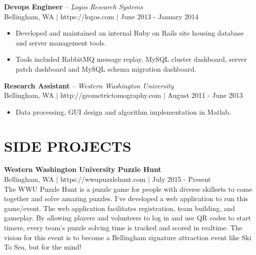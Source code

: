 \documentclass[line,margin]{res}
\begin{document}
\begin{resume}
    {\bf Devops Engineer} -- {\sl Logos Research Systems} \\
    {\footnotesize Bellingham, WA $|$ https://logos.com $|$ June 2013 - January 2014}
    \begin{itemize} \itemsep -2pt
        \item Developed and maintained an internal Ruby on Rails site housing database and server management tools.
        \item Tools included RabbitMQ message replay, MySQL cluster dashboard, server patch dashboard and MySQL schema migration dashboard.
    \end{itemize}

    {\bf Research Assistant} -- {\sl Western Washington University} \\
    {\footnotesize Bellingham, WA $|$ http://geometrictomography.com $|$ August 2011 - June 2013}
    \begin{itemize}  \itemsep -2pt
        \item Data processing, GUI design and algorithm implementation in Matlab.
    \end{itemize}



\newpage

\section{SIDE PROJECTS}
    {\bf Western Washington University Puzzle Hunt} \\
    {\footnotesize Bellingham, WA $|$ https://wwupuzzlehunt.com $|$ July 2015 - Present} \\
    The WWU Puzzle Hunt is a puzzle game for people with diverse skillsets to come together and solve amazing puzzles.
    I've developed a web application to run this game/event. The web application facilitates registration, team building, and gameplay.
    By allowing players and volunteers to log in and use QR codes to start timers, every team's puzzle solving time is tracked and scored in realtime.  The vision for this event is to become a Bellingham signature attraction event like Ski To Sea, but for the mind!



\end{resume}
\end{document}
